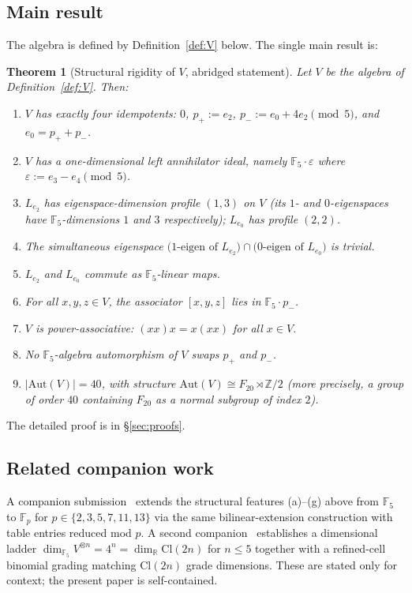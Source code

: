 \documentclass[11pt,reqno]{amsart}
\theoremstyle{plain}
\newtheorem{theorem}{Theorem}[section]
\theoremstyle{definition}
\theoremstyle{remark}
\newcommand{\Z}{\mathbb{Z}}
\newcommand{\F}{\mathbb{F}}
\newcommand{\R}{\mathbb{R}}
\newcommand{\Cl}{\mathrm{Cl}}
\newcommand{\Aut}{\mathrm{Aut}}
\begin{document}
\subsection{Main result}

The algebra is defined by Definition~\ref{def:V} below. The single main result is:

\begin{theorem}[Structural rigidity of $V$, abridged statement] \label{thm:struct-abridged}
Let $V$ be the algebra of Definition~\ref{def:V}. Then:
\begin{enumerate}[label=\textup{(\alph*)}]
\item $V$ has exactly four idempotents: $0$, $p_+ := e_2$, $p_- := e_0 + 4 e_2 \pmod 5$, and $e_0 = p_+ + p_-$.
\item $V$ has a one-dimensional left annihilator ideal, namely $\F_5 \cdot \varepsilon$ where $\varepsilon := e_3 - e_4 \pmod 5$.
\item $L_{e_2}$ has eigenspace-dimension profile $(1, 3)$ on $V$ (its $1$- and $0$-eigenspaces have $\F_5$-dimensions $1$ and $3$ respectively); $L_{e_0}$ has profile $(2, 2)$.
\item The simultaneous eigenspace $\bigl(\text{1-eigen of } L_{e_2}\bigr) \cap \bigl(\text{0-eigen of } L_{e_0}\bigr)$ is trivial.
\item $L_{e_2}$ and $L_{e_0}$ commute as $\F_5$-linear maps.
\item For all $x, y, z \in V$, the associator $[x, y, z]$ lies in $\F_5 \cdot p_-$.
\item $V$ is power-associative: $(xx) x = x (xx)$ for all $x \in V$.
\item No $\F_5$-algebra automorphism of $V$ swaps $p_+$ and $p_-$.
\item $|\Aut(V)| = 40$, with structure $\Aut(V) \cong F_{20} \rtimes \Z/2$ (more precisely, a group of order $40$ containing $F_{20}$ as a normal subgroup of index $2$).
\end{enumerate}
\end{theorem}

The detailed proof is in §\ref{sec:proofs}.

\subsection{Related companion work}

A companion submission~\cite{SandersGishFpUniversality} extends the structural features (a)--(g) above from $\F_5$ to $\F_p$ for $p \in \{2, 3, 5, 7, 11, 13\}$ via the same bilinear-extension construction with table entries reduced mod $p$. A second companion~\cite{SandersGishCliffordLadder} establishes a dimensional ladder $\dim_{\F_5} V^{\otimes n} = 4^n = \dim_\R \Cl(2n)$ for $n \leq 5$ together with a refined-cell binomial grading matching $\Cl(2n)$ grade dimensions. These are stated only for context; the present paper is self-contained.
\end{document}
